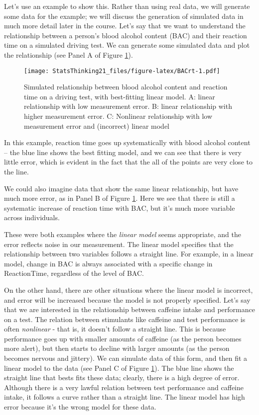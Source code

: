 \documentclass[]{book}
\theoremstyle{definition}
\theoremstyle{definition}
\theoremstyle{definition}
\theoremstyle{remark}
\begin{document}
Let's use an example to show this. Rather than using real data, we will
generate some data for the example; we will discuss the generation of
simulated data in much more detail later in the course. Let's say that
we want to understand the relationship between a person's blood alcohol
content (BAC) and their reaction time on a simulated driving test. We
can generate some simulated data and plot the relationship (see Panel A
of Figure \ref{fig:BACrt}).

\begin{figure}
\centering
\texttt{[image: StatsThinking21\_files/figure-latex/BACrt-1.pdf]}
\caption{\label{fig:BACrt}Simulated relationship between blood alcohol
content and reaction time on a driving test, with best-fitting linear
model. A: linear relationship with low measurement error. B: linear
relationship with higher measurement error. C: Nonlinear relationship
with low measurement error and (incorrect) linear model}
\end{figure}

In this example, reaction time goes up systematically with blood alcohol
content -- the blue line shows the best fitting model, and we can see
that there is very little error, which is evident in the fact that the
all of the points are very close to the line.

We could also imagine data that show the same linear relationship, but
have much more error, as in Panel B of Figure \ref{fig:BACrt}. Here we
see that there is still a systematic increase of reaction time with BAC,
but it's much more variable across individuals.

These were both examples where the \emph{linear model} seems
appropriate, and the error reflects noise in our measurement. The linear
model specifies that the relationship between two variables follows a
straight line. For example, in a linear model, change in BAC is always
associated with a specific change in ReactionTime, regardless of the
level of BAC.

On the other hand, there are other situations where the linear model is
incorrect, and error will be increased because the model is not properly
specified. Let's say that we are interested in the relationship between
caffeine intake and performance on a test. The relation between
stimulants like caffeine and test performance is often \emph{nonlinear}
- that is, it doesn't follow a straight line. This is because
performance goes up with smaller amounts of caffeine (as the person
becomes more alert), but then starts to decline with larger amounts (as
the person becomes nervous and jittery). We can simulate data of this
form, and then fit a linear model to the data (see Panel C of Figure
\ref{fig:BACrt}). The blue line shows the straight line that bests fits
these data; clearly, there is a high degree of error. Although there is
a very lawful relation between test performance and caffeine intake, it
follows a curve rather than a straight line. The linear model has high
error because it's the wrong model for these data.
\end{document}
